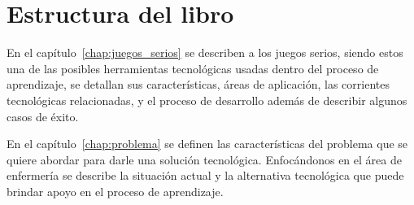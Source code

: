 \section{Estructura del libro}
    





En el capítulo~\ref{chap:juegos_serios} se describen a los juegos serios, siendo 
estos una de las posibles herramientas tecnológicas usadas dentro del proceso de aprendizaje, 
se detallan sus características, áreas de aplicación, las corrientes tecnológicas relacionadas, 
y el proceso de desarrollo además de describir algunos casos de éxito.



En el capítulo~\ref{chap:problema} se definen las características del problema
que se quiere abordar para darle una solución tecnológica. Enfocándonos en el
área de enfermería se describe la situación actual y la alternativa tecnológica 
que puede brindar apoyo en el proceso de aprendizaje.




